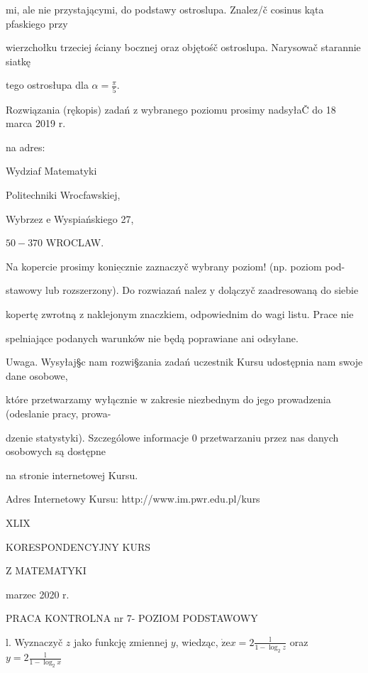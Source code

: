 \documentclass[a4paper,12pt]{article}
\begin{document}
mi, ale nie przystającymi, do podstawy ostroslupa. Znalez/č cosinus kąta pfaskiego przy

wierzchołku trzeciej ściany bocznej oraz objętośč ostroslupa. Narysowač starannie siatkę

tego ostrosłupa dla $\displaystyle \alpha=\frac{\pi}{5}.$

Rozwiązania (rękopis) zadań $\mathrm{z}$ wybranego poziomu prosimy nadsyłaČ do 18 marca 2019 $\mathrm{r}.$

na adres:

Wydziaf Matematyki

Politechniki Wrocfawskiej,

Wybrzez $\mathrm{e}$ Wyspiańskiego 27,

$50-370$ WROCLAW.

Na kopercie prosimy $\underline{\mathrm{k}\mathrm{o}\mathrm{n}\mathrm{i}\mathrm{e}\mathrm{c}\mathrm{z}\mathrm{n}\mathrm{i}\mathrm{e}}$ zaznaczyč wybrany poziom! (np. poziom pod-

stawowy lub rozszerzony). Do rozwiazań nalez $\mathrm{y}$ dolączyč zaadresowaną do siebie

kopertę zwrotną $\mathrm{z}$ naklejonym znaczkiem, odpowiednim do wagi listu. Prace nie

spelniające podanych warunków nie będą poprawiane ani odsyłane.

Uwaga. Wysyłaj\S c nam rozwi\S zania zadań uczestnik Kursu udostępnia nam swoje dane osobowe,

które przetwarzamy wyłącznie $\mathrm{w}$ zakresie niezbednym do jego prowadzenia (odeslanie pracy, prowa-

dzenie statystyki). Szczególowe informacje $0$ przetwarzaniu przez nas danych osobowych są dostępne

na stronie internetowej Kursu.

Adres Internetowy Kursu: http://www.im.pwr.edu.pl/kurs







XLIX

KORESPONDENCYJNY KURS

Z MATEMATYKI

marzec 2020 r.

PRACA KONTROLNA nr 7- POZIOM PODSTAWOWY

l. Wyznaczyč $z$ jako funkcję zmiennej $y$, wiedząc, $\displaystyle \dot{\mathrm{z}}\mathrm{e}x=2\frac{\mathrm{l}}{1-\log_{2}z}$ oraz $y=2\displaystyle \frac{\mathrm{l}}{1-\log_{2}x}$
\end{document}
